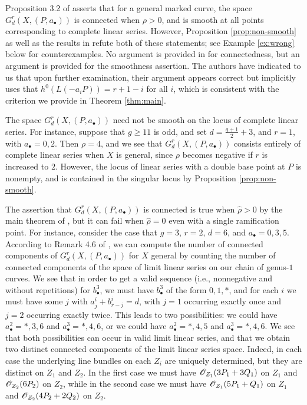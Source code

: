 \documentclass{amsart}
\begin{document}
\begin{rem}\label{rem:wrong}
Proposition 3.2 of \cite{c-h-t1} asserts that for a general marked curve,
the space $G^r_d(X,(P,a_{\bullet}))$
is connected when $\rho>0$, and is smooth at all points corresponding to
complete linear series. However, Proposition \ref{prop:non-smooth} as well
as the results in \cite{os26} refute both of these statements; see
Example \ref{ex:wrong} below for counterexamples. No argument is 
provided in \cite{c-h-t1} for connectedness, but an argument is provided
for the smoothness assertion. The authors have indicated to us that
upon further examination, their argument appears correct but implicitly uses 
that $h^0(L(-a_i P))=r+1-i$ for all $i$, which is consistent with the 
criterion we provide in Theorem \ref{thm:main}.
\end{rem}

\begin{ex}\label{ex:wrong}
The space $G^r_d(X,(P,a_{\bullet}))$ need not be smooth on the locus of
complete linear series. For instance,
suppose that $g \geq 11$ is odd, and set
$d=\frac{g+1}{2}+3$, and $r=1$, with $a_{\bullet}=0,2$. Then $\rho=4$,
and we see that $G^r_d(X,(P,a_{\bullet}))$ consists entirely of complete
linear series when $X$ is general, since $\rho$ becomes negative if
$r$ is increased to $2$. However, the locus of linear series with a 
double base point at $P$ is nonempty, and is contained in the singular
locus by Proposition \ref{prop:non-smooth}.

The assertion that $G^r_d(X,(P,a_{\bullet}))$ is connected
is true when $\widehat{\rho}>0$ by the main 
theorem of \cite{os26}, but it can fail when $\widehat{\rho}=0$ even with
a single ramification point. For instance, consider the case that $g=3$,
$r=2$, $d=6$, and $a_{\bullet}=0,3,5$. According to Remark 4.6 of
\cite{os26}, we can compute the number of connected components of
$G^r_d(X,(P,a_{\bullet}))$ for $X$ general by counting the number of
connected components of the space of limit linear series on our chain
of genus-$1$ curves. We see that in order to get a valid sequence 
(i.e., nonnegative and without repetitions) for $b^3_{\bullet}$, we 
must have $b^3_{\bullet}$ of the form $0,1,*$, and for
each $i$ we must have some $j$ with $a^i_j+b^i_{r-j}=d$, 
with $j=1$ occurring exactly once and $j=2$ occurring 
exactly twice. This leads to two possibilities: we could have
$a^2_{\bullet}=*,3,6$ and $a^3_{\bullet}=*,4,6$, or we could have
$a^2_{\bullet}=*,4,5$ and $a^3_{\bullet}=*,4,6$. We see that both
possibilities can occur in valid limit linear series, and that we obtain
two distinct connected components of the limit linear series space. Indeed,
in each case the underlying line bundles on each $Z_i$ are uniquely
determined, but they are distinct on $Z_1$ and $Z_2$. In the
first case we must have 
${\mathscr O}_{Z_1}(3P_1+3Q_1)$ on $Z_1$ and ${\mathscr O}_{Z_2}(6P_2)$ on $Z_2$, while in
the second case we must have
${\mathscr O}_{Z_1}(5P_1+Q_1)$ on $Z_1$ and ${\mathscr O}_{Z_2}(4P_2+2Q_2)$ on $Z_2$.
\end{ex}




%
%
\end{document}
